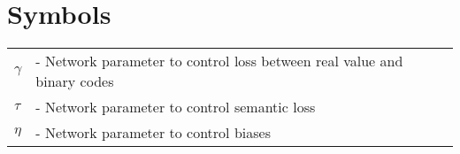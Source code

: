 \chapter*{Symbols}
\begin{center}
\small{
\begin{tabular}{ll}

        $\gamma$  &- Network parameter to control loss between real value and binary codes  \\
	$\tau$	  &- Network parameter to control semantic loss \\
    $\eta$	&- Network parameter to control biases	\\

      
\end{tabular}
}
\end{center}

\clearpage 

